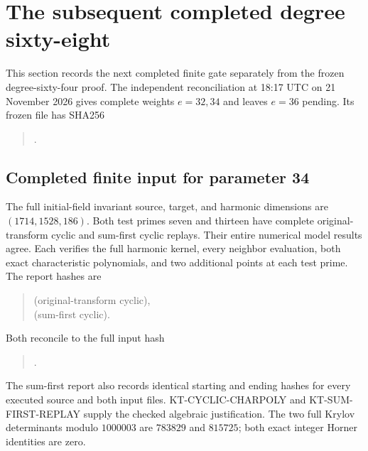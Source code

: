 \section{The subsequent completed degree sixty-eight}
\label{sec:kt-later-vanishing}

This section records the next completed finite gate separately
from the frozen degree-sixty-four proof.  The independent
reconciliation at 18:17 UTC on 21 November 2026 gives complete
weights $e=32,34$ and leaves $e=36$ pending.  Its frozen file
 has SHA256
\begin{quote}\small
{}.
\end{quote}

\subsection{Completed finite input for parameter 34}

The full initial-field invariant source, target, and harmonic
dimensions are $(1714,1528,186)$.  Both test primes seven and
thirteen have complete original-transform cyclic and
sum-first cyclic replays.  Their entire numerical model
results agree.  Each verifies the full harmonic kernel,
every neighbor evaluation, both exact characteristic
polynomials, and two additional points at each test prime.
The report hashes are
\begin{quote}\small
{}
\quad(original-transform cyclic),\\
\quad(sum-first cyclic).
\end{quote}
Both reconcile to the full input hash
\begin{quote}\small
{}.
\end{quote}
The sum-first report also records identical starting and ending
hashes for every executed source and both input files.
KT-CYCLIC-CHARPOLY and KT-SUM-FIRST-REPLAY supply the
checked algebraic justification.  The two full Krylov
determinants modulo $1000003$ are $783829$ and $815725$;
both exact integer Horner identities are zero.

